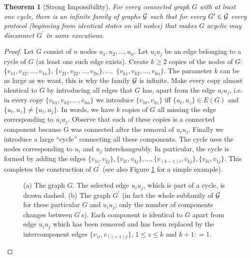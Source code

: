 \documentclass[preprint]{elsarticle}
\newcommand{\coleq}{\mathrel{\mathop:}=}
\newtheorem{theorem}{Theorem}
\begin{document}
\begin{theorem} [Strong Impossibility] \label{the:strong-impossibility}
For every connected graph $G$ with at least one cycle, there is an infinite family of graphs $\cal{G}$ such that for every $G^\prime\in \cal{G}$ every protocol (beginning from identical states on all nodes) that makes $G$ acyclic may disconnect $G^\prime$ in some executions.
\end{theorem}
\begin{proof}
Let $G$ consist of $n$ nodes $u_1,u_2,\ldots,u_n$. Let $u_iu_j$ be an edge
belonging to a cycle of $G$ (at least one such edge exists). Create $k\geq 2$
copies of the nodes of $G$: $\{v_{11},v_{12},\ldots,v_{1n}\}$, $\{v_{21},v_{22},\ldots,v_{2n}\},\ldots,$
$\{v_{k1},v_{k2},\ldots,v_{kn}\}$. The parameter $k$ can be as large as we want, this is why
the family $\cal{G}$ is infinite. Make every copy almost identical to $G$ by
introducing all edges that $G$ has, apart from the edge $u_iu_j$, i.e. in
every copy $\{v_{h1},v_{h2},\ldots,v_{hn}\}$ we introduce $\{v_{ht},v_{hz}\}$ iff
$\{u_t,u_z\}\in E(G)$ and  $\{u_t,u_z\}\neq \{u_i,u_j\}$. In words, we have $k$ copies
of $G$ all missing the edge corresponding to $u_iu_j$. Observe that each of
these copies is a connected component because G was connected after the
removal of $u_iu_j$. Finally we introduce a large ``cycle'' connecting all
these components. The cycle uses the nodes corresponding to $u_i$ and $u_j$
interchangeably. In particular, the cycle is formed by adding the edges
$\{v_{1i},v_{2j}\},\{v_{2i},v_{3j}\},\ldots,\{v_{(k-1)i},v_{kj}\},\{v_{ki},v_{1j}\}$. This completes the
construction of $G^\prime$ (see also Figure \ref{fig:impossibility} for a simple example).

\begin{figure}[!hbtp]
   \caption{(a) The graph $G$. The selected edge $u_iu_j$, which is part of a cycle, is drawn dashed. (b) The graph $G^\prime$ (in fact the whole subfamily of $\cal{G}$ for these particular $G$ and $u_iu_j$; only the number of components changes between $G^\prime$s). Each component is identical to $G$ apart from edge $u_iu_j$ which has been removed and has been replaced by the intercomponent edges $\{v_{zi},v_{(z+1)j}\}$, $1\leq z\leq k$ and $k+1\coleq 1$.} \label{fig:impossibility}
\end{figure}


\end{proof}
\end{document}
